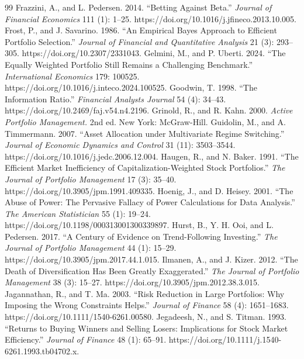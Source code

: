 \documentclass[12pt,letterpaper]{article}
\newcommand{\nuevo}[1]{{\color{nuevoc}#1}}
\begin{document}
\begin{thebibliography}{99}
 Frazzini, A., and L. Pedersen. 2014. ``Betting Against Beta.'' \emph{Journal of Financial Economics} 111 (1): 1–25. https://doi.org/10.1016/j.jfineco.2013.10.005.
 Frost, P., and J. Savarino. 1986. ``An Empirical Bayes Approach to Efficient Portfolio Selection.'' \emph{Journal of Financial and Quantitative Analysis} 21 (3): 293–305. https://doi.org/10.2307/2331043.
 Gelmini, M., and P. Uberti. 2024. ``The Equally Weighted Portfolio Still Remains a Challenging Benchmark.'' \emph{International Economics} 179: 100525. https://doi.org/10.1016/j.inteco.2024.100525.
 \nuevo{Goodwin, T. 1998. ``The Information Ratio.'' \emph{Financial Analysts Journal} 54 (4): 34–43. https://doi.org/10.2469/faj.v54.n4.2196.}
 \nuevo{Grinold, R., and R. Kahn. 2000. \emph{Active Portfolio Management.} 2nd ed. New York: McGraw-Hill.}
 Guidolin, M., and A. Timmermann. 2007. ``Asset Allocation under Multivariate Regime Switching.'' \emph{Journal of Economic Dynamics and Control} 31 (11): 3503–3544. https://doi.org/10.1016/j.jedc.2006.12.004.
 Haugen, R., and N. Baker. 1991. ``The Efficient Market Inefficiency of Capitalization-Weighted Stock Portfolios.'' \emph{The Journal of Portfolio Management} 17 (3): 35–40. https://doi.org/10.3905/jpm.1991.409335.
 \nuevo{Hoenig, J., and D. Heisey. 2001. ``The Abuse of Power: The Pervasive Fallacy of Power Calculations for Data Analysis.'' \emph{The American Statistician} 55 (1): 19–24. https://doi.org/10.1198/000313001300339897.}
 Hurst, B., Y. H. Ooi, and L. Pedersen. 2017. ``A Century of Evidence on Trend-Following Investing.'' \emph{The Journal of Portfolio Management} 44 (1): 15–29. https://doi.org/10.3905/jpm.2017.44.1.015.
 Ilmanen, A., and J. Kizer. 2012. ``The Death of Diversification Has Been Greatly Exaggerated.'' \emph{The Journal of Portfolio Management} 38 (3): 15–27. https://doi.org/10.3905/jpm.2012.38.3.015.
 Jagannathan, R., and T. Ma. 2003. ``Risk Reduction in Large Portfolios: Why Imposing the Wrong Constraints Helps.'' \emph{Journal of Finance} 58 (4): 1651–1683. https://doi.org/10.1111/1540-6261.00580.
 Jegadeesh, N., and S. Titman. 1993. ``Returns to Buying Winners and Selling Losers: Implications for Stock Market Efficiency.'' \emph{Journal of Finance} 48 (1): 65–91. https://doi.org/10.1111/j.1540-6261.1993.tb04702.x.

\end{thebibliography}
\end{document}
